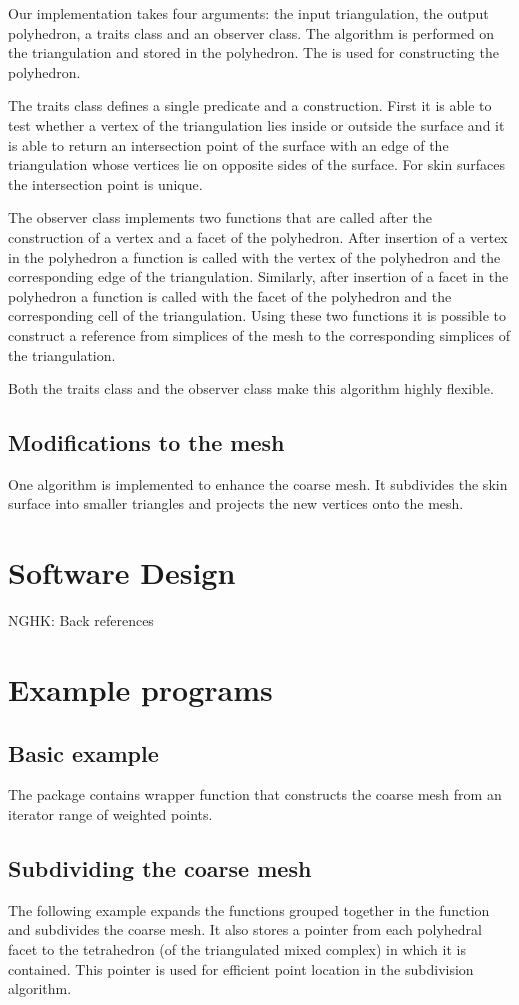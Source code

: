 Our implementation takes four arguments: the input triangulation, the
output polyhedron, a traits class and an observer class.  The
algorithm is performed on the triangulation and stored in the
polyhedron. The  is used for
constructing the polyhedron.

The traits class defines a single predicate and a construction. First
it is able to test whether a vertex of the triangulation lies inside
or outside the surface and it is able to return an intersection point
of the surface with an edge of the triangulation whose vertices lie on
opposite sides of the surface. For skin surfaces the intersection
point is unique.

The observer class implements two functions that are called after the
construction of a vertex and a facet of the polyhedron. After
insertion of a vertex in the polyhedron a function is called with the
vertex of the polyhedron and the corresponding edge of the
triangulation. Similarly, after insertion of a facet in the polyhedron
a function is called with the facet of the polyhedron and the
corresponding cell of the triangulation. Using these two functions it
is possible to construct a reference from simplices of the mesh to the
corresponding simplices of the triangulation.

Both the traits class and the observer class make this algorithm highly
flexible.
\subsection{Modifications to the mesh}
One algorithm is implemented to enhance the coarse mesh. It subdivides
the skin surface into smaller triangles and projects the new vertices
onto the mesh.
\section{Software Design}
NGHK: Back references
\section{Example programs}
\subsection{Basic example}
The package contains wrapper function that constructs the coarse mesh
from an iterator range of weighted points.

\subsection{Subdividing the coarse mesh}
The following example expands the functions grouped together in the
function  and subdivides the coarse mesh. It also
stores a pointer from each polyhedral facet to the tetrahedron (of the
triangulated mixed complex) in which it is contained. This pointer is
used for efficient point location in the subdivision algorithm.




